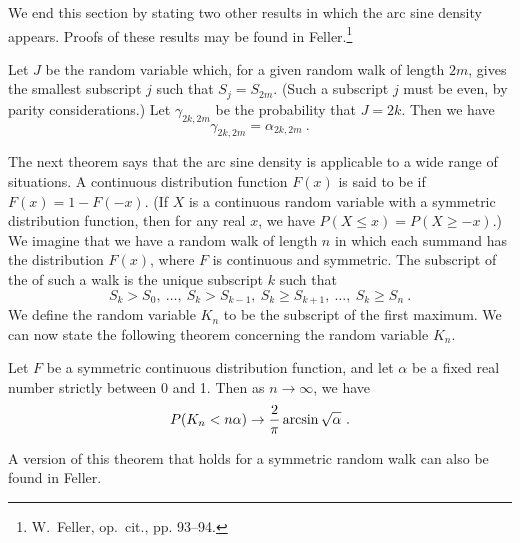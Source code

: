 We end this section by stating two other results in which the arc sine density appears. 
Proofs of these results may be found in Feller.\footnote{W.~Feller, op.\ cit., pp. 93--94.}
\begin{theorem}\label{thm 12.3.2}
Let $J$ be the random variable which, for a given random walk of length $2m$, gives the
smallest subscript $j$ such that $S_{j} = S_{2m}$.  (Such a subscript $j$ must be even,
by parity considerations.)  Let $\gamma_{2k, 2m}$ be the probability that $J = 2k$.  Then we
have
$$\gamma_{2k, 2m} = \alpha_{2k, 2m}\ .$$
\end{theorem}
The next theorem says that the arc sine density is applicable to a wide range of
situations.  A continuous distribution function $F(x)$ is said to
be  if $F(x) = 1 - F(-x)$.  (If $X$ is a continuous random variable
with a symmetric distribution function, then for any real $x$, we have $P(X \le x) = P(X
\ge -x)$.)  We imagine that we have a random walk of length $n$ in which each summand
has the distribution
$F(x)$, where $F$ is continuous and symmetric.  The subscript of the  of such a walk is the unique subscript $k$ such that 
$$S_k > S_0,\ \ldots,\ S_k > S_{k-1},\ S_k \ge S_{k+1},\ \ldots,\ S_k \ge S_n\ .$$
We define the random variable $K_n$ to be the subscript of the
first maximum.  We can now state the following theorem concerning the random variable $K_n$. 
\begin{theorem}\label{thm 12.3.3}
Let $F$ be a symmetric continuous distribution function, and let $\alpha$ be a fixed real number
strictly between 0 and 1.  Then as $n \rightarrow \infty$, we have
$$P(K_n < n\alpha) \rightarrow {2\over \pi} \arcsin\sqrt \alpha\ .$$
\end{theorem}
\par
A version of this theorem that holds for a symmetric random walk can also be found in Feller.

